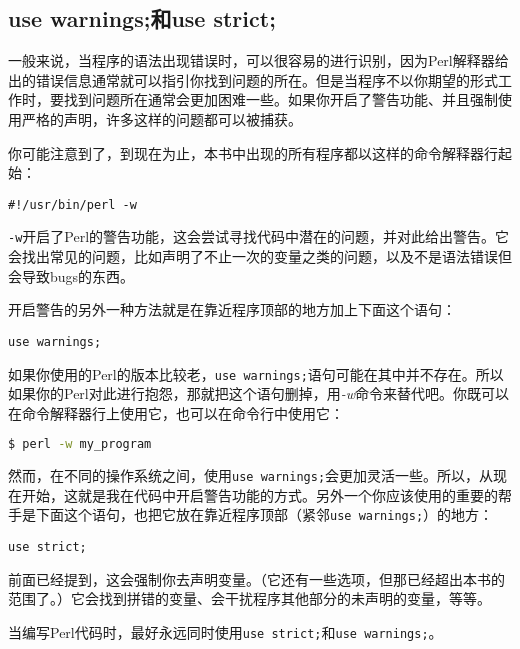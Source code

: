 \subsection{use warnings;和use strict;}
一般来说，当程序的语法出现错误时，可以很容易的进行识别，因为Perl解释器给出的错误信息通常就可以指引你找到问题的所在。但是当程序不以你期望的形式工作时，要找到问题所在通常会更加困难一些。如果你开启了警告功能、并且强制使用严格的声明，许多这样的问题都可以被捕获。

你可能注意到了，到现在为止，本书中出现的所有程序都以这样的命令解释器行起始：

\begin{lstlisting}
#!/usr/bin/perl -w
\end{lstlisting}

\verb|-w|开启了Perl的警告功能，这会尝试寻找代码中潜在的问题，并对此给出警告。它会找出常见的问题，比如声明了不止一次的变量之类的问题，以及不是语法错误但会导致bugs的东西。

开启警告的另外一种方法就是在靠近程序顶部的地方加上下面这个语句：

\begin{lstlisting}
use warnings;
\end{lstlisting}

如果你使用的Perl的版本比较老，\verb|use warnings;|语句可能在其中并不存在。所以如果你的Perl对此进行抱怨，那就把这个语句删掉，用\textit{-w}命令来替代吧。你既可以在命令解释器行上使用它，也可以在命令行中使用它：

\begin{lstlisting}[language=bash]
$ perl -w my_program
\end{lstlisting}

然而，在不同的操作系统之间，使用\verb|use warnings;|会更加灵活一些。所以，从现在开始，这就是我在代码中开启警告功能的方式。另外一个你应该使用的重要的帮手是下面这个语句，也把它放在靠近程序顶部（紧邻\verb|use warnings;|）的地方：

\begin{lstlisting}
use strict;
\end{lstlisting}

前面已经提到，这会强制你去声明变量。（它还有一些选项，但那已经超出本书的范围了。）它会找到拼错的变量、会干扰程序其他部分的未声明的变量，等等。

\begin{adjustwidth}{2cm}{2cm}
\noindent
当编写Perl代码时，最好永远同时使用\verb|use strict;|和\verb|use warnings;|。
\end{adjustwidth}

